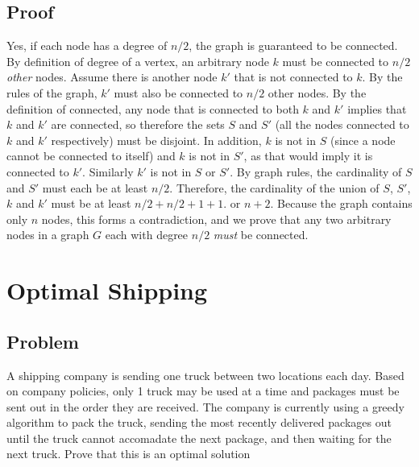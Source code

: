 \documentclass[titlepage]{article}
\numberwithin{equation}{subsection}
\begin{document}
\subsection{Proof}
Yes, if each node has a degree of $n/2$, the graph is guaranteed to be
connected. By definition of degree of a vertex, an arbitrary node $k$
must be connected to $n/2$ \textit{other} nodes. Assume there is another
node $k'$ that is not connected to $k$. By the rules of the graph, 
$k'$ must also be connected to $n/2$ other nodes. By the definition of
connected, any node that is connected to both $k$ and $k'$ implies that
$k$ and $k'$ are connected, so therefore the sets $S$ and $S'$ (all the
nodes connected to $k$ and $k'$ respectively) must be disjoint. In
addition, $k$ is not in $S$ (since a node cannot be connected to itself)
and $k$ is not in $S'$, as that would imply it is connected to $k'$.
Similarly $k'$ is not in $S$ or $S'$. By graph rules, the cardinality of 
$S$ and $S'$ must each be at least $n/2$. Therefore, the cardinality of
the union of $S$, $S'$, $k$ and $k'$ must be at least $n/2 + n/2 + 1 + 1$.
or $n + 2$. Because the graph contains only $n$ nodes, this forms a 
contradiction, and we prove that any two arbitrary nodes in a graph $G$
each with degree $n/2$ \textit{must} be connected.
\section{Optimal Shipping}
\subsection{Problem}
A shipping company is sending one truck between two locations each day.
Based on company policies, only 1 truck may be used at a time and packages
must be sent out in the order they are received. The company is 
currently using a greedy algorithm to pack the truck, sending the most 
recently delivered packages out until the truck cannot accomadate
the next package, and then waiting for the next truck. Prove that this
is an optimal solution
\end{document}
